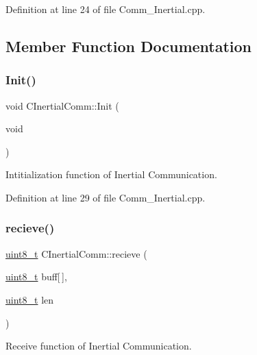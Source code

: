 Definition at line 24 of file Comm\+\_\+\+Inertial.\+cpp.



\subsection{Member Function Documentation}
\mbox{\label{class_c_inertial_comm_aa8c4c1dc4ca32817bb51c520c052b4c3}} 
\subsubsection{\texorpdfstring{Init()}{Init()}}
{\footnotesize\ttfamily void C\+Inertial\+Comm\+::\+Init (\begin{DoxyParamCaption}\item[{void}]{ }\end{DoxyParamCaption})}



Intitialization function of Inertial Communication. 



Definition at line 29 of file Comm\+\_\+\+Inertial.\+cpp.

\mbox{\label{class_c_inertial_comm_abaed54099a0192df5a9318dc99de3668}} 
\subsubsection{\texorpdfstring{recieve()}{recieve()}}
{\footnotesize\ttfamily \mbox{\hyperlink{_a_d_a_s___types_8h_aba7bc1797add20fe3efdf37ced1182c5}{uint8\+\_\+t}} C\+Inertial\+Comm\+::recieve (\begin{DoxyParamCaption}\item[{\mbox{\hyperlink{_a_d_a_s___types_8h_aba7bc1797add20fe3efdf37ced1182c5}{uint8\+\_\+t}}}]{buff\mbox{[}$\,$\mbox{]},  }\item[{\mbox{\hyperlink{_a_d_a_s___types_8h_aba7bc1797add20fe3efdf37ced1182c5}{uint8\+\_\+t}}}]{len }\end{DoxyParamCaption})}



Receive function of Inertial Communication. 



